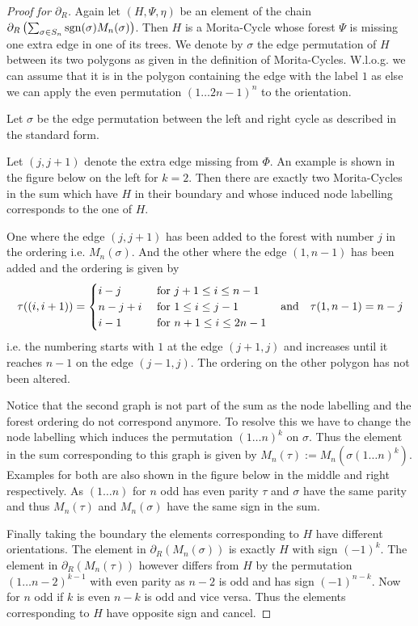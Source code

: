 \begin{proof}[Proof for $\partial_{R}$]
	Again let $(H,\Psi,\eta)$ be an element of the chain $\partial_{R}\left(\sum_{\sigma \in S_{n}} \operatorname{sgn}(\sigma) M_{n}(\sigma)\right)$.
	Then $H$ is a Morita-Cycle whose forest $\Psi$ is missing one extra edge in one of its trees.
	We denote by $\sigma$ the edge permutation of $H$ between its two polygons as given in the definition of Morita-Cycles.
	W.l.o.g. we can assume that it is in the polygon containing the 
	edge with the label $1$ as else we can apply the even permutation $(1 \ldots 2n-1)^{n}$ to the orientation.
	
	Let $\sigma$ be the edge permutation between the left and right cycle as described in the standard form.

	Let $(j,j+1)$ denote the extra edge missing from  $\Phi$. An example is shown in the figure below on the left for $k = 2$.
	Then there are exactly two Morita-Cycles in the sum which have $H$ in their boundary and whose induced node labelling corresponds to the one of $H$.

	One where the edge $(j,j+1)$ has been added to the forest with number $j$ in the ordering i.e. $M_{n}(\sigma)$.
	And the other where the edge $(1,n-1)$ has been added and the ordering is given by
	\[
		\tau((i,i+1)) = \begin{cases}
			i-j & \text{ for } j+1 \leq i \leq n-1\\
			n-j+i & \text{ for } 1 \leq i \leq j-1\\
			i-1 & \text{ for } n+1 \leq i \leq 2n-1
		\end{cases} \qq{and} \tau(1,n-1) = n-j
	\] i.e. the numbering starts with $1$ at the edge $(j+1,j)$ and increases until it reaches $n-1$ on the edge  $(j-1,j)$. 
	The ordering on the other polygon has not been altered.
	
	Notice that the second graph is not part of the sum as the node labelling and the forest ordering do not correspond anymore. 
	To resolve this we have to change the node labelling which induces the permutation $(1 \ldots n)^{k}$ on $\sigma$.
	Thus the element in the sum corresponding to this graph is given by  $M_{n}(\tau) := M_{n}(\sigma (1 \ldots n)^{k})$.
	Examples for both are also shown in the figure below in the middle and right respectively.
	As $(1 \ldots n)$ for $n$ odd has even parity $\tau$ and $\sigma$ have the same parity and thus $M_{n}(\tau)$ and $M_{n}(\sigma)$ have the same sign
	in the sum. 
	
	Finally taking the boundary the elements corresponding to $H$ have different orientations.
	The element in $\partial_{R}(M_{n}(\sigma))$ is exactly $H$ with sign $(-1)^{k}$. The element in $\partial_{R}(M_{n}(\tau))$ however 
	differs from $H$ by the permutation $(1 \ldots n-2)^{k - 1}$ with even parity as $n-2$ is odd and has sign $(-1)^{n-k}$.
	Now for $n$ odd if $k$ is even $n-k$ is odd and vice versa. Thus the elements corresponding to $H$ have opposite sign and cancel.


\end{proof}
